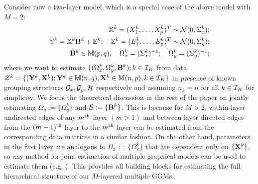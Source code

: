 Consider now a two-layer model, which is a special case of the above model with $M=2$:
%
\begin{eqnarray}
{\mathbb{X}}^k = (X^k_1, \ldots, X^k_p)^T \sim {\cal{N}} (0, \Sigma^k_{x});\\
{\mathbb{Y}}^k = {\mathbb{X}}^k {\mathbf{B}}^k + {\mathbb{E}}^k; \quad {\mathbb{E}}^k = (E^k_1, \ldots, E^k_p)^T \sim {\cal{N}} (0, \Sigma^k_{y});\\
{\mathbf{B}}^k \in {\mathbb{M}}(p,q), \quad \Omega^k_{x} = (\Sigma^k_{x})^{-1}; \quad \Omega^k_y = (\Sigma^k_{y})^{-1};
\end{eqnarray}
%
where we want to estimate $\{ (\Omega^k_{x}, \Omega^k_{y}, {\mathbf{B}}^k); k \in {\cal{I}}_K$ from data ${\cal{Z}}^k = \{ ({\mathbf{Y}}^k, {\mathbf{X}}^k); {\mathbf{Y}}^k \in {\mathbb{M}}(n,q), {\mathbf{X}}^k \in {\mathbb{M}}(n,p), k \in {\cal{I}}_K\}$ in presence of known grouping structures ${\cal{G}}_x, {\cal{G}}_y, {\cal{H}}$ respectively and assuming $n_k = n$ for all $k \in {\cal{I}}_K$ for simplicity. We focus the theoretical discussion in the rest of the paper on jointly estimating $\Omega_{y}:= \{ \Omega_{y}^k \}$ and ${\cal{B}} := \{ {\mathbf{B}}^k \}$. This is because for $M>2$, within-layer undirected edges of any $m{\operatorname*{^{\text{th}}}}$ layer $(m>1)$ and between-layer directed edges from the $(m-1){\operatorname*{^{\text{th}}}}$ layer to the $m{\operatorname*{^{\text{th}}}}$ layer can be estimated from the corresponding data matrices in a similar fashion. On the other hand, parameters in the first layer are analogous to $\Omega_{x} := \{ \Omega_{x}^k \}$ that are dependent only on $\{ {\mathbf{X}}^k\}$, so any method for joint estimation of multiple graphical models can be used to estimate them (e.g. \cite{GuoEtal11, MaMichailidis15}). This provides all building blocks for estimating the full hierarchical structure of our $M$-layered multiple GGMs.


